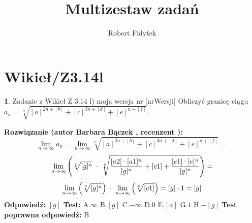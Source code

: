 \documentclass[12pt, a4paper]{article}
\title{Multizestaw zadań}
\author{Robert Fidytek}
\date{}
\theoremstyle{definition} %
\newtheorem{zad}{}
\newcommand{\kategoria}[1]{\section{#1}} %
\newcommand{\zadStart}[1]{\begin{zad}#1\newline} %
\newcommand{\zadStop}{\end{zad}}   %
\newcommand{\rozwStart}[2]{\noindent \textbf{Rozwiązanie (autor #1 , recenzent #2): }\newline} %
\newcommand{\rozwStop}{\newline}                                            %
\newcommand{\odpStart}{\noindent \textbf{Odpowiedź:}\newline}    %
\newcommand{\odpStop}{\newline}                                             %
\newcommand{\testStart}{\noindent \textbf{Test:}\newline} %
\newcommand{\testStop}{\newline} %
\newcommand{\kluczStart}{\noindent \textbf{Test poprawna odpowiedź:}\newline} %
\newcommand{\kluczStop}{\newline} %
\begin{document}
\maketitle


\kategoria{Wikieł/Z3.14l}
\zadStart{Zadanie z Wikieł Z 3.14 l) moja wersja nr [nrWersji]}
Obliczyć granicę ciągu $a_n= \sqrt[n]{[a]^{2n+[b]}+ [c]^{3n+[d]}+ [e]^{n+[f]}}$.
\zadStop
\rozwStart{Barbara Bączek}{}
$$\lim_{n \rightarrow \infty} a_n= \lim_{n \rightarrow \infty} \sqrt[n]{[a]^{2n+[b]}+ [c]^{3n+[d]}+ [e]^{n+[f]}}=$$
$$ \lim_{n \rightarrow \infty} \Bigg{(} \sqrt[n]{[g]^{n}} \hspace{0.1 cm} \cdot \hspace{0.1 cm} \sqrt[n]{\frac{[a2] \cdot [a1]^n}{[g]^{n}}+ [c1] + \frac{[e1] \cdot [e]^n}{[g]^{n}}} \Bigg{)}=$$
$$ \lim_{n \rightarrow \infty} \Big{(} \sqrt[n]{[g]^{n}} \Big{)} \hspace{0.1 cm} \cdot \hspace{0.1 cm} \lim_{n \rightarrow \infty} \Big{(} \sqrt[n]{[c1]}\Big{)}= [g] \cdot 1= [g]$$
\rozwStop
\odpStart
$[g]$
\odpStop
\testStart
A.$\infty$
B.$[g]$
C.$-\infty$
D.$0$
E.$[a]$
G.$1$
H.$-[g]$
\testStop
\kluczStart
B
\kluczStop
\end{document}
